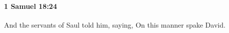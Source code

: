 
		\paragraph{1 Samuel 18:24} %
			\label{1SAMUEL-18-24}

			And the servants of Saul told him, saying, On this manner spake David.


